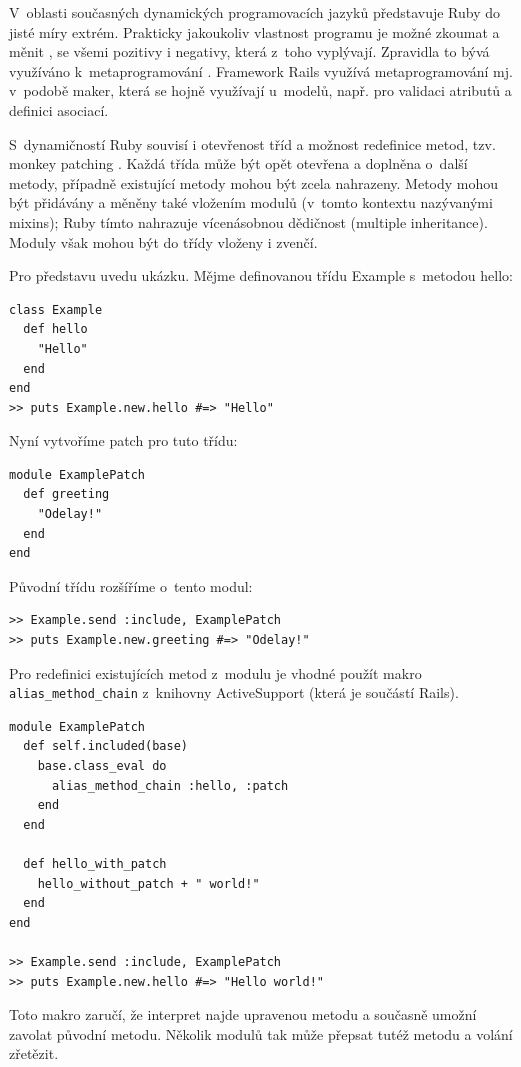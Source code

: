 \documentclass[thesis=B,czech]{FITthesis}[2012/05/02]
\begin{document}
V~oblasti současných dynamických programovacích jazyků představuje Ruby do jisté
míry extrém. Prakticky jakoukoliv vlastnost programu je možné zkoumat
a měnit , se všemi pozitivy i negativy, která z~toho vyplývají.
Zpravidla to bývá využíváno k~metaprogramování \citep[3c]{why2008}.
Framework Rails využívá metaprogramování mj. v~podobě maker, která se
hojně využívají u~modelů, např. pro validaci atributů a definici
asociací.

S~dynamičností Ruby souvisí i otevřenost tříd a možnost redefinice
metod, tzv. monkey patching \citep[str. 293]{Olsen2011}. Každá třída
může být opět otevřena a doplněna o~další metody, případně existující
metody mohou být zcela nahrazeny. Metody mohou být přidávány a měněny
také vložením modulů (v~tomto kontextu nazývanými mixins); Ruby tímto
nahrazuje vícenásobnou dědičnost (multiple inheritance). Moduly však
mohou být do třídy vloženy i zvenčí.

Pro představu uvedu ukázku. Mějme definovanou třídu Example
s~metodou hello:

\begin{lstlisting}
class Example
  def hello
    "Hello"
  end
end
>> puts Example.new.hello #=> "Hello"
\end{lstlisting}
Nyní vytvoříme patch pro tuto třídu:

\begin{lstlisting}
module ExamplePatch
  def greeting
    "Odelay!"
  end
end
\end{lstlisting}
Původní třídu rozšíříme o~tento modul:

\begin{lstlisting}
>> Example.send :include, ExamplePatch
>> puts Example.new.greeting #=> "Odelay!"
\end{lstlisting}
Pro redefinici existujících metod z~modulu je vhodné použít makro \\
\lstinline!alias_method_chain! z~knihovny
ActiveSupport (která je součástí Rails).

\begin{lstlisting}
module ExamplePatch
  def self.included(base)
    base.class_eval do
      alias_method_chain :hello, :patch
    end
  end

  def hello_with_patch
    hello_without_patch + " world!"
  end
end

>> Example.send :include, ExamplePatch
>> puts Example.new.hello #=> "Hello world!"
\end{lstlisting}
Toto makro zaručí, že interpret najde upravenou metodu a současně umožní
zavolat původní metodu. Několik modulů tak může přepsat tutéž metodu a
volání zřetězit.
\end{document}
